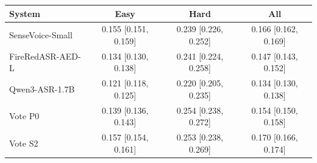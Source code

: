 \begin{tabular}{lccc}
\toprule
System & Easy & Hard & All \\
\midrule
SenseVoice-Small & 0.155 [0.151, 0.159] & 0.239 [0.226, 0.252] & 0.166 [0.162, 0.169] \\
FireRedASR-AED-L & 0.134 [0.130, 0.138] & 0.241 [0.224, 0.258] & 0.147 [0.143, 0.152] \\
Qwen3-ASR-1.7B & 0.121 [0.118, 0.125] & 0.220 [0.205, 0.235] & 0.134 [0.130, 0.138] \\
Vote P0 & 0.139 [0.136, 0.143] & 0.254 [0.238, 0.272] & 0.154 [0.150, 0.158] \\
Vote S2 & 0.157 [0.154, 0.161] & 0.253 [0.238, 0.269] & 0.170 [0.166, 0.174] \\
\bottomrule
\end{tabular}
